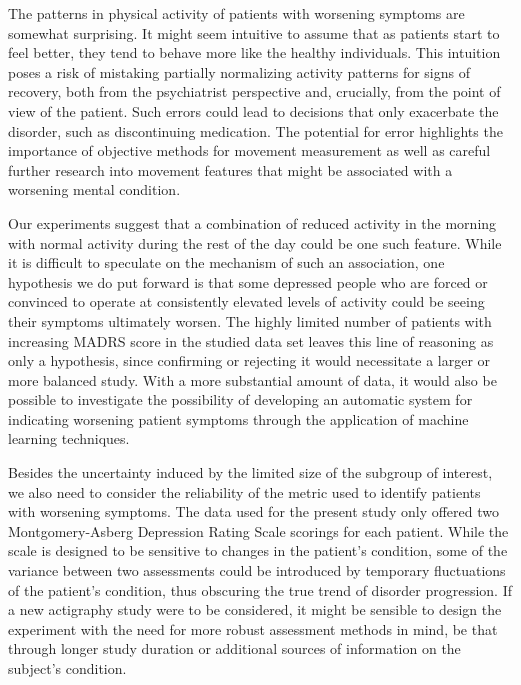 \documentclass[12pt]{article}
\begin{document}
The patterns in physical activity of patients with worsening symptoms are somewhat surprising. It might seem intuitive to assume that as patients start to feel better, they tend to behave more like the healthy individuals. This intuition poses a risk of mistaking partially normalizing activity patterns for signs of recovery, both from the psychiatrist perspective and, crucially, from the point of view of the patient. Such errors could lead to decisions that only exacerbate the disorder, such as discontinuing medication. The potential for error highlights the importance of objective methods for movement measurement as well as careful further research into movement features that might be associated with a worsening mental condition.

Our experiments suggest that a combination of reduced activity in the morning with normal activity during the rest of the day could be one such feature. While it is difficult to speculate on the mechanism of such an association, one hypothesis we do put forward is that some depressed people who are forced or convinced to operate at consistently elevated levels of activity could be seeing their symptoms ultimately worsen. The highly limited number of patients with increasing MADRS score in the studied data set leaves this line of reasoning as only a hypothesis, since confirming or rejecting it would necessitate a larger or more balanced study. With a more substantial amount of data, it would also be possible to investigate the possibility of developing an automatic system for indicating worsening patient symptoms through the application of machine learning techniques.

Besides the uncertainty induced by the limited size of the subgroup of interest, we also need to consider the reliability of the metric used to identify patients with worsening symptoms. The data used for the present study only offered two Montgomery-Asberg Depression Rating Scale scorings for each patient. While the scale is designed to be sensitive to changes in the patient's condition, some of the variance between two assessments could be introduced by temporary fluctuations of the patient's condition, thus obscuring the true trend of disorder progression. If a new actigraphy study were to be considered, it might be sensible to design the experiment with the need for more robust assessment methods in mind, be that through longer study duration or additional sources of information on the subject's condition.



\newpage
\printbibliography
\end{document}
